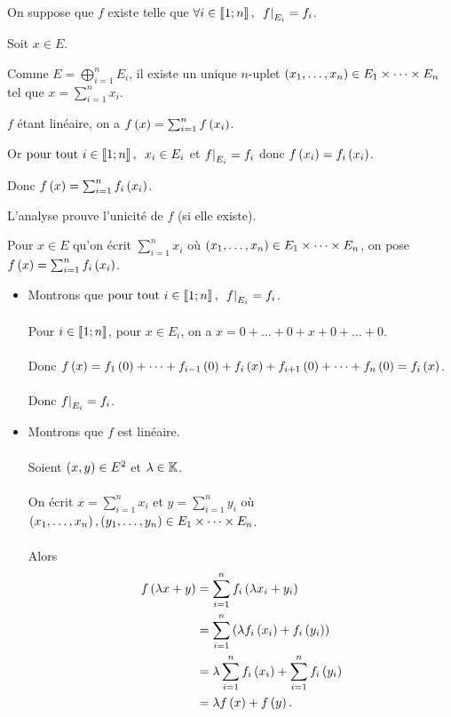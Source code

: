 \begin{dem}
\analyse

On suppose que \(f\) existe telle que \(\quantifs{\forall i\in\interventierii{1}{n}}\restr{f}{E_i}=f_i\).

Soit \(x\in E\).

Comme \(E=\bigoplus_{i=1}^nE_i\), il existe un unique \(n\)-uplet \(\left(x_1,\dots,x_n\right)\in E_1\times\dots\times E_n\) tel que \(x=\sum_{i=1}^nx_i\).

\(f\) étant linéaire, on a \(f\left(x\right)=\sum_{i=1}^nf\left(x_i\right)\).

Or \(\quantifs{\tpt i\in\interventierii{1}{n}}x_i\in E_i\) et \(\restr{f}{E_i}=f_i\) donc \(f\left(x_i\right)=f_i\left(x_i\right)\).

Donc \(f\left(x\right)=\sum_{i=1}^nf_i\left(x_i\right)\).

L'analyse prouve l'unicité de \(f\) (si elle existe).

\synthese

Pour \(x\in E\) qu'on écrit \(\sum_{i=1}^nx_i\) où \(\left(x_1,\dots,x_n\right)\in E_1\times\dots\times E_n\), on pose \(f\left(x\right)=\sum_{i=1}^nf_i\left(x_i\right)\).

\begin{itemize}
    \item Montrons que \(\quantifs{\tpt i\in\interventierii{1}{n}}\restr{f}{E_i}=f_i\). \\\\ Pour \(i\in\left\llbracket1;n\right\rrbracket\), pour \(x\in E_i\), on a \(x=0+\dots+0+x+0+\dots+0\). \\\\ Donc \(f\left(x\right)=f_1\left(0\right)+\dots+f_{i-1}\left(0\right)+f_i\left(x\right)+f_{i+1}\left(0\right)+\dots+f_n\left(0\right)=f_i\left(x\right)\). \\\\ Donc \(\restr{f}{E_i}=f_i\). \\
    \item Montrons que \(f\) est linéaire. \\\\ Soient \(\left(x,y\right)\in E^2\) et \(\lambda\in\mathbb{K}\). \\\\ On écrit \(x=\sum_{i=1}^nx_i\) et \(y=\sum_{i=1}^ny_i\) où \(\left(x_1,\dots,x_n\right),\left(y_1,\dots,y_n\right)\in E_1\times\dots\times E_n\). \\\\ Alors \[\begin{aligned}
        f\left(\lambda x+y\right)&=\sum_{i=1}^nf_i\left(\lambda x_i+y_i\right) \\
        &=\sum_{i=1}^n\left(\lambda f_i\left(x_i\right)+f_i\left(y_i\right)\right) \\
        &=\lambda\sum_{i=1}^nf_i\left(x_i\right)+\sum_{i=1}^nf_i\left(y_i\right) \\
        &=\lambda f\left(x\right)+f\left(y\right).
    \end{aligned}\]
\end{itemize}
\end{dem}

